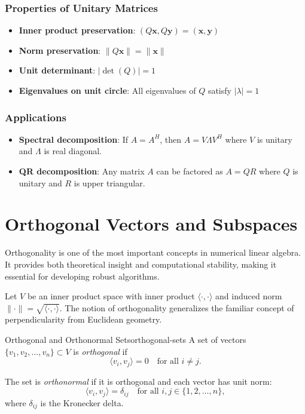 \documentclass[../../main.tex]{subfiles}
\begin{document}
\subsubsection{Properties of Unitary Matrices}

\begin{itemize}
    \item \textbf{Inner product preservation}: $(Q\mathbf{x}, Q\mathbf{y}) = (\mathbf{x}, \mathbf{y})$
    \item \textbf{Norm preservation}: $\|Q\mathbf{x}\| = \|\mathbf{x}\|$
    \item \textbf{Unit determinant}: $|\det(Q)| = 1$
    \item \textbf{Eigenvalues on unit circle}: All eigenvalues of $Q$ satisfy $|\lambda| = 1$
\end{itemize}

\subsubsection{Applications}
\begin{itemize}
    \item \textbf{Spectral decomposition}: If $A = A^H$, then $A = V\Lambda V^H$ where $V$ is unitary and $\Lambda$ is real diagonal.
    \item \textbf{QR decomposition}: Any matrix $A$ can be factored as $A = QR$ where $Q$ is unitary and $R$ is upper triangular.
\end{itemize}

\section{Orthogonal Vectors and Subspaces}
\label{sec:orthogonal-subspaces}

Orthogonality is one of the most important concepts in numerical linear algebra. It provides both theoretical insight and computational stability, making it essential for developing robust algorithms.

Let $V$ be an inner product space with inner product $\langle \cdot, \cdot \rangle$ and induced norm $\|\cdot\| = \sqrt{\langle \cdot, \cdot \rangle}$. The notion of orthogonality generalizes the familiar concept of perpendicularity from Euclidean geometry.

\begin{definition}{Orthogonal and Orthonormal Sets}{orthogonal-sets}
    A set of vectors $\{v_1, v_2, \ldots, v_n\} \subset V$ is \emph{orthogonal} if
    \[
        \langle v_i, v_j \rangle = 0 \quad \text{for all } i \neq j.
    \]

    The set is \emph{orthonormal} if it is orthogonal and each vector has unit norm:
    \[
        \langle v_i, v_j \rangle = \delta_{ij} \quad \text{for all } i, j \in \{1, 2, \ldots, n\},
    \]
    where $\delta_{ij}$ is the Kronecker delta.
\end{definition}
\end{document}
